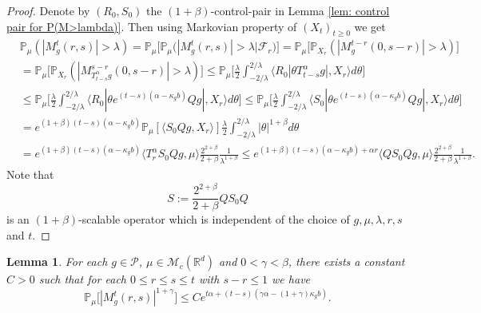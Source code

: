 \documentclass[12pt,oneside,english]{amsart}
\theoremstyle{plain}
\newtheorem{lem}[thm]{Lemma}
\theoremstyle{definition}
\numberwithin{equation}{section}
\begin{document}
\begin{proof}
    Denote by $(R_0,S_0)$ the $(1+\beta)$-control-pair in Lemma \ref{lem: control pair for P(M>lambda)}.
    Then using Markovian property of $(X_t)_{t\geq 0}$ we get
\begin{align}
    &\mathbb P_{\mu}(|M^t_g(r,s)|>\lambda)
    = \mathbb P_\mu \big[\mathbb P_\mu\big(|M_g^t(r,s)|> \lambda\big| \mathscr F_r\big)\big]
    = \mathbb P_\mu \big[\mathbb P_{X_r}(|M^{t-r}_g(0,s-r)|> \lambda)\big]
    \\&= \mathbb P_\mu \big[\mathbb P_{X_r}(|M^{s-r}_{T^\alpha_{t-s}g}(0,s-r)|> \lambda)\big]
    \leq \mathbb P_\mu \Big[ \frac{\lambda}{2}\int_{-2/\lambda}^{2/\lambda}\langle R_0|\theta T^\alpha_{t-s}g|,X_r\rangle d\theta \Big]
    \\&\leq \mathbb P_\mu \Big[ \frac{\lambda}{2}\int_{-2/\lambda}^{2/\lambda}\langle R_0|\theta e^{(t-s)(\alpha- \kappa_gb)}Qg|,X_r\rangle d\theta \Big]
    \leq \mathbb P_\mu \Big[ \frac{\lambda}{2}\int_{-2/\lambda}^{2/\lambda}\langle S_0|\theta e^{(t-s)(\alpha- \kappa_gb)}Qg|,X_r\rangle d\theta \Big]
    \\& = e^{(1+\beta)(t-s)(\alpha- \kappa_gb)} \mathbb P_\mu [ \langle S_0Qg,X_r\rangle ] \frac{\lambda}{2}\int_{-2/\lambda}^{2/\lambda}|\theta|^{1+\beta}d\theta
    \\& = e^{(1+\beta)(t-s)(\alpha- \kappa_gb)} \langle T_r^\alpha S_0Qg,\mu\rangle  \frac{2^{2+\beta}}{2+\beta}\frac{1}{\lambda^{1+\beta}}
    \leq e^{(1+\beta)(t-s)(\alpha- \kappa_gb)+ \alpha r} \langle QS_0Qg,\mu\rangle  \frac{2^{2+\beta}}{2+\beta}\frac{1}{\lambda^{1+\beta}}.
\end{align}
    Note that
\[
    S := \frac{2^{2+\beta}}{2+\beta}QS_0Q
\]
    is an $(1+\beta)$-scalable operator which is independent of the choice of $g,\mu, \lambda, r, s$ and $t$.
\end{proof}

\begin{lem}\label{lem: control of mgtrs}
    For each $g\in \mathcal P$, $\mu \in \mathcal M_c(\mathbb{R}^d)$ and $0<\gamma < \beta$, there exists a constant $C>0$ such that for each $0\leq r\leq s\leq t$ with $s-r \leq 1$ we have
\[
    \mathbb P_\mu\big[|M^t_g(r,s)|^{1+\gamma}\big]
    \leq C e^{t\alpha+(t-s) (\gamma\alpha- (1+\gamma)\kappa_gb)}.
\]
\end{lem}
\end{document}
